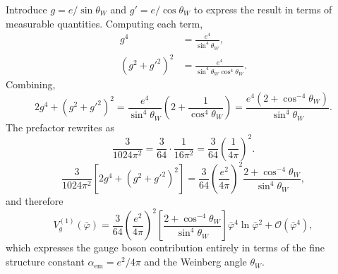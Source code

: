Introduce $g = e/\sin\theta_W$ and
$g' = e/\cos\theta_W$ to express the result in terms of measurable
quantities. Computing each term,
\begin{align}
	g^4          & = \frac{e^4}{\sin^4\theta_W},               \\
	(g^2+g'^2)^2 & = \frac{e^4}{\sin^4\theta_W\cos^4\theta_W}.
\end{align}
Combining,
\begin{equation}
	2g^4 + (g^2+g'^2)^2
	= \frac{e^4}{\sin^4\theta_W}
	\left(2 + \frac{1}{\cos^4\theta_W}\right)
	= \frac{e^4\left(2+\cos^{-4}\theta_W\right)}{\sin^4\theta_W}.
\end{equation}
The prefactor rewrites as
\begin{equation}
	\frac{3}{1024\pi^2} = \frac{3}{64}\cdot\frac{1}{16\pi^2}
	= \frac{3}{64}\left(\frac{1}{4\pi}\right)^2.
\end{equation}
\begin{equation}
	\frac{3}{1024\pi^2}\left[2g^4+(g^2+g'^2)^2\right]
	= \frac{3}{64}\left(\frac{e^2}{4\pi}\right)^2
	\frac{2+\cos^{-4}\theta_W}{\sin^4\theta_W},
\end{equation}
and therefore
\begin{equation}
	V_g^{(1)}(\bar\varphi) = \frac{3}{64}\left(\frac{e^2}{4\pi}\right)^2
	\left[\frac{2+\cos^{-4}\theta_W}{\sin^4\theta_W}\right]
	\bar\varphi^4\ln\bar\varphi^2 + \mathcal{O}(\bar\varphi^4),
\end{equation}
which expresses the gauge boson contribution entirely in terms of the
fine structure constant $\alpha_\text{em} = e^2/4\pi$ and the Weinberg
angle $\theta_W$.

